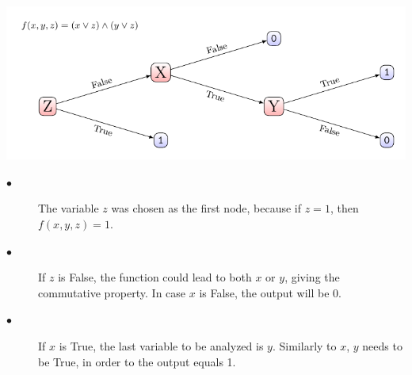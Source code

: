 \documentclass{article}
\begin{document}
	\includegraphics{decision_tree.pdf}
	\begin{description}
		\item[$\bullet$] The variable $z$ was chosen as the first node, because if $z = 1$, then $f(x,y,z) = 1$.
		\item[$\bullet$] If $z$ is False, the function could lead to both $x$ or $y$, giving the commutative property. In case $x$ is False, the output will be 0.
		\item[$\bullet$] If $x$ is True, the last variable to be analyzed is $y$. Similarly to $x$, $y$ needs to be True, in order to the output equals 1.
	\end{description}
\end{document}

